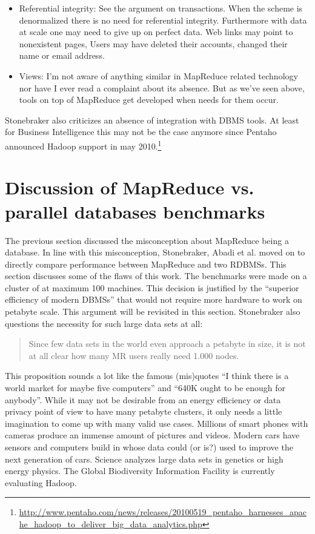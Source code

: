 \documentclass[12pt,a4paper]{scrartcl}		%
\begin{document}
\begin{itemize}
\item Referential integrity: See the argument on transactions. When the scheme is denormalized there is no need for referential integrity. Furthermore with data at scale one may need to give up on perfect data. Web links may point to nonexistent pages, Users may have deleted their accounts, changed their name or email address.
\item Views: I'm not aware of anything similar in MapReduce related technology nor have I ever read a complaint about its absence. But as we've seen above, tools on top of MapReduce get developed when needs for them occur.
\end{itemize}
Stonebraker also criticizes an absence of integration with DBMS tools. At least for Business Intelligence this may not be the case anymore since Pentaho announced Hadoop support in may 2010.\footnote{\url{http://www.pentaho.com/news/releases/20100519_pentaho_harnesses_apache_hadoop_to_deliver_big_data_analytics.php}}

\section{Discussion of MapReduce vs. parallel databases benchmarks}
The previous section discussed the misconception about MapReduce being a database. In line with this misconception, Stonebraker, Abadi et al. moved on to directly compare performance between MapReduce and two RDBMSs.\cite{Pavlo09} This section discusses some of the flaws of this work.
The benchmarks were made on a cluster of at maximum 100 machines. This decision is justified by the ``superior efficiency of modern DBMSs'' that would not require more hardware to work on petabyte scale. This argument will be revisited in this section. 
Stonebraker also questions the necessity for such large data sets at all:
\begin{quote}
  Since few data sets in the world even approach a petabyte in size, it is not at all clear how many MR users really need 1.000 nodes.
\end{quote}
This proposition sounds a lot like the famous (mis)quotes ``I think there is a world market for maybe five computers'' and ``640K ought to be enough for anybody''. While it may not be desirable from an energy efficiency or data privacy point of view to have many petabyte clusters, it only needs a little imagination to come up with many valid use cases. Millions of smart phones with cameras produce an immense amount of pictures and videos. Modern cars have sensors and computers build in whose data could (or is?) used to improve the next generation of cars. Science analyzes large data sets in genetics or high energy physics. The Global Biodiversity Information Facility is currently evaluating Hadoop.
\end{document}
